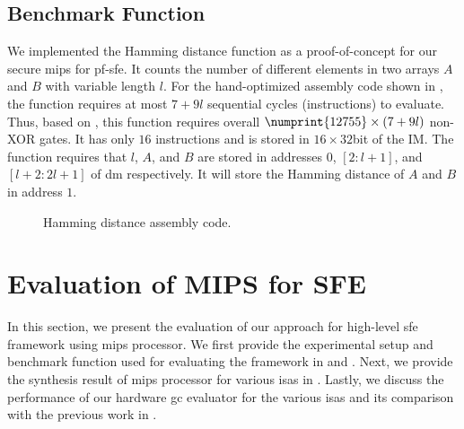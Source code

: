 \subsection{Benchmark Function}
We implemented the Hamming distance function as a proof-of-concept for our secure \gls{mips} for \acrshort{pf-sfe}.
It counts the number of different elements in two arrays $A$ and $B$ with variable length $l$.
For the hand-optimized assembly code shown in , the function requires at most $7+9l$ sequential cycles (instructions) to evaluate.
Thus, based on , this function requires overall $\numprint{12755}\times(7+9l)$ non-XOR gates.
It has only $16$ instructions and is stored in $16\times32$bit of the IM.
The function requires that $l$, $A$, and $B$ are stored in addresses $0$, $[2:l+1]$, and $[l+2:2l+1]$ of \acrshort{dm} respectively.
It will store the Hamming distance of $A$ and $B$ in address $1$.



\begin{figure}[ht]
\centering
\resizebox{!}{0.45\textheight}{%

}
\caption{Hamming distance assembly code.}\label{figure:hamminassembly}
\end{figure}

\section{Evaluation of MIPS for SFE} \label{sec:eval-mips-sfe}
In this section, we present the evaluation of our approach for high-level \acrshort{sfe} framework using \gls{mips} processor.
We first provide the experimental setup and benchmark function used for evaluating the framework in  and .
Next, we provide the synthesis result of \gls{mips} processor for various \acrshort{isa}s in .
Lastly, we discuss the performance of our hardware \acrshort{gc} evaluator for the various \acrshort{isa}s and its comparison with the previous work in .


